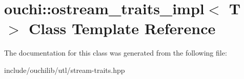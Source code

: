\hypertarget{classouchi_1_1ostream__traits__impl}{}\section{ouchi\+::ostream\+\_\+traits\+\_\+impl$<$ T $>$ Class Template Reference}
\label{classouchi_1_1ostream__traits__impl}


The documentation for this class was generated from the following file\+:\begin{DoxyCompactItemize}
\item 
include/ouchilib/utl/stream-\/traits.\+hpp\end{DoxyCompactItemize}
